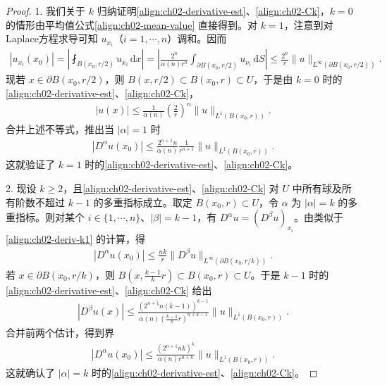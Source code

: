\documentclass[../../main.tex]{subfiles}
\begin{document}
\begin{proof}
1. 我们关于 $k$ 归纳证明\eqref{align:ch02-derivative-est}、\eqref{align:ch02-Ck}，$k=0$ 的情形由平均值公式\eqref{align:ch02-mean-value} 直接得到。对 $k=1$，注意到对Laplace方程求导可知 $u_{x_i}$（$i=1,\cdots,n$）调和。因而
\begin{align}\label{align:ch02-deriv-k1}
|u_{x_i}(x_0)|=\left|\fint_{B(x_0,r/2)}u_{x_i}\,\mathrm{d}x\right|
=\left|\frac{2^n}{\alpha(n)r^n}\int_{\partial B(x_0,r/2)}u_{\nu_i}\,\mathrm{d}S\right|
\leqslant\frac{2^n}{r}\|u\|_{L^\infty(\partial B(x_0,r/2))}.
\end{align}
现若 $x\in\partial B(x_0,r/2)$，则 $B(x,r/2)\subset B(x_0,r)\subset U$，于是由 $k=0$ 时的\eqref{align:ch02-derivative-est}、\eqref{align:ch02-Ck}，
\begin{align*}
|u(x)|\leqslant\frac{1}{\alpha(n)}\left(\frac{2}{r}\right)^n\|u\|_{L^1(B(x_0,r))}.
\end{align*}
合并上述不等式，推出当 $|\alpha|=1$ 时
\begin{align*}
|D^\alpha u(x_0)|\leqslant\frac{2^{n+1}n}{\alpha(n)}\frac{1}{r^{n+1}}\|u\|_{L^1(B(x_0,r))}.
\end{align*}
这就验证了 $k=1$ 时的\eqref{align:ch02-derivative-est}、\eqref{align:ch02-Ck}。

2. 现设 $k\geqslant 2$，且\eqref{align:ch02-derivative-est}、\eqref{align:ch02-Ck} 对 $U$ 中所有球及所有阶数不超过 $k-1$ 的多重指标成立。取定 $B(x_0,r)\subset U$，令 $\alpha$ 为 $|\alpha|=k$ 的多重指标。则对某个 $i\in\{1,\cdots,n\}$、$|\beta|=k-1$，有 $D^\alpha u=(D^\beta u)_{x_i}$。由类似于\eqref{align:ch02-deriv-k1} 的计算，得
\begin{align*}
|D^\alpha u(x_0)|\leqslant\frac{nk}{r}\|D^\beta u\|_{L^\infty(\partial B(x_0,r/k))}.
\end{align*}
若 $x\in\partial B(x_0,r/k)$，则 $B(x,\frac{k-1}{k}r)\subset B(x_0,r)\subset U$。于是 $k-1$ 时的\eqref{align:ch02-derivative-est}、\eqref{align:ch02-Ck} 给出
\begin{align*}
|D^\beta u(x)|\leqslant\frac{(2^{n+1}n(k-1))^{k-1}}{\alpha(n)\left(\frac{k-1}{k}r\right)^{n+k-1}}\|u\|_{L^1(B(x_0,r))}.
\end{align*}
合并前两个估计，得到界
\begin{align}\label{align:ch02-deriv-induct}
|D^\alpha u(x_0)|\leqslant\frac{(2^{n+1}nk)^k}{\alpha(n)r^{n+k}}\|u\|_{L^1(B(x_0,r))}.
\end{align}
这就确认了 $|\alpha|=k$ 时的\eqref{align:ch02-derivative-est}、\eqref{align:ch02-Ck}。
\end{proof}
\end{document}
